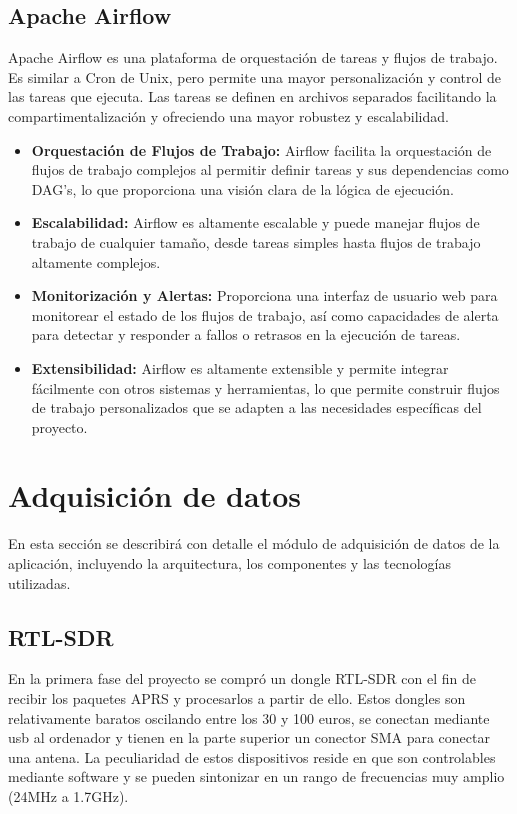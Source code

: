 \subsection{Apache Airflow}
Apache Airflow es una plataforma de orquestación de tareas y flujos de trabajo. Es similar a Cron de Unix, pero permite una mayor personalización y control de las tareas que ejecuta. Las tareas se definen en archivos separados facilitando la compartimentalización y ofreciendo una mayor robustez y escalabilidad.
\begin{itemize}
	\item \textbf{Orquestación de Flujos de Trabajo:} Airflow facilita la orquestación de flujos de trabajo complejos al permitir definir tareas y sus dependencias como DAG's, lo que proporciona una visión clara de la lógica de ejecución.
	\item \textbf{Escalabilidad:} Airflow es altamente escalable y puede manejar flujos de trabajo de cualquier tamaño, desde tareas simples hasta flujos de trabajo altamente complejos.
	\item \textbf{Monitorización y Alertas:} Proporciona una interfaz de usuario web para monitorear el estado de los flujos de trabajo, así como capacidades de alerta para detectar y responder a fallos o retrasos en la ejecución de tareas.
	\item \textbf{Extensibilidad:} Airflow es altamente extensible y permite integrar fácilmente con otros sistemas y herramientas, lo que permite construir flujos de trabajo personalizados que se adapten a las necesidades específicas del proyecto.
\end{itemize}

\section{Adquisición de datos}
En esta sección se describirá con detalle el módulo de adquisición de datos de la aplicación, incluyendo la arquitectura, los componentes y las tecnologías utilizadas.
\subsection{RTL-SDR}
En la primera fase del proyecto se compró un dongle RTL-SDR con el fin de recibir los paquetes APRS y procesarlos a partir de ello. Estos dongles son relativamente baratos oscilando entre los 30 y 100 euros, se conectan mediante usb al ordenador y tienen en la parte superior un conector SMA para conectar una antena. La peculiaridad de estos dispositivos reside en que son controlables mediante software y se pueden sintonizar en un rango de frecuencias muy amplio (24MHz a 1.7GHz).

